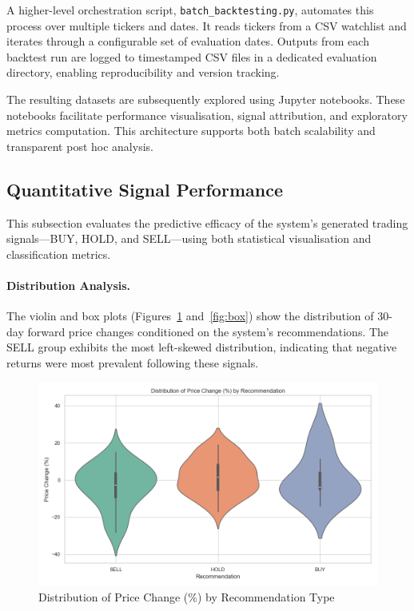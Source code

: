 A higher-level orchestration script, \texttt{batch\_backtesting.py}, automates this process over multiple tickers and dates. It reads tickers from a CSV watchlist and iterates through a configurable set of evaluation dates. Outputs from each backtest run are logged to timestamped CSV files in a dedicated evaluation directory, enabling reproducibility and version tracking.

The resulting datasets are subsequently explored using Jupyter notebooks. These notebooks facilitate performance visualisation, signal attribution, and exploratory metrics computation. This architecture supports both batch scalability and transparent post hoc analysis.

\subsection{Quantitative Signal Performance}

This subsection evaluates the predictive efficacy of the system's generated trading signals—BUY, HOLD, and SELL—using both statistical visualisation and classification metrics.

\paragraph{Distribution Analysis.}  
The violin and box plots (Figures~\ref{fig:violin} and~\ref{fig:box}) show the distribution of 30-day forward price changes conditioned on the system’s recommendations. The SELL group exhibits the most left-skewed distribution, indicating that negative returns were most prevalent following these signals. 

\begin{figure}[h]
  \centering
  \includegraphics[width=0.6\linewidth]{assets/violin_plot.png}
  \caption{Distribution of Price Change (\%) by Recommendation Type}
  \label{fig:violin}
\end{figure}

